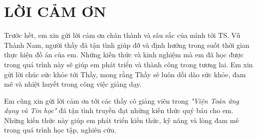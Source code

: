 
\chapter*{\centering LỜI CẢM ƠN}


Trước hết, em xin gửi lời cảm ơn chân thành và sâu sắc của mình tới TS. Vũ Thành Nam, người thầy đã tận tình giúp đỡ và định hướng trong suốt thời gian thực hiện đồ án của em. Những kiến thức và kinh nghiệm mà em đã học được trong quá trình này sẽ giúp em phát triển và thành công trong tương lai. Em xin gửi lời chúc sức khỏe tới Thầy, mong rằng Thầy sẽ luôn dồi dào sức khỏe, đam mê và nhiệt huyết trong công việc giảng dạy.

Em cũng xin gửi lời cảm ơn tới các thầy cô giảng viên trong \textit{"Viện Toán ứng dụng và Tin học"} đã tận tình truyền đạt những kiến thức quý báu cho em. Những kiến thức này giúp em phát triển kiến thức, kỹ năng và lòng đam mê trong quá trình học tập, nghiên cứu.










